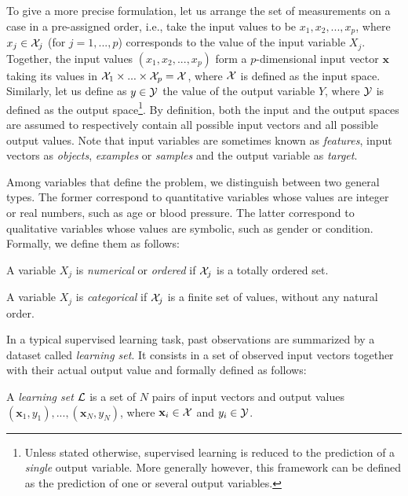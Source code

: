 To give a more precise formulation, let us arrange the set of measurements on a
case in a pre-assigned order, i.e., take the input values to be $x_1, x_2, ...,
x_p$, where $x_j \in {\cal X}_j$ (for $j = 1, ..., p$) corresponds to the value
of the input variable $X_j$. Together, the input values $(x_1, x_2, ..., x_p)$
form a $p$-dimensional input vector $\mathbf{x}$ taking its values in ${\cal
X}_1 \times ... \times {\cal X}_p = {\cal X}$, where ${\cal X}$ is defined as
the input space. Similarly, let us define as $y \in {\cal Y}$ the value of the
output variable $Y$, where ${\cal Y}$ is defined as the output
space\footnote{Unless stated otherwise, supervised learning is reduced to the
prediction of a \textit{single} output variable. More generally however, this
framework can be defined as the prediction of one or several output variables.}.
By definition, both the input and the output spaces are assumed to respectively
contain all possible input vectors and all possible output values. Note that
input variables are sometimes known as {\it features}, input vectors as {\it
objects}, {\it examples} or {\it samples} and the output variable as {\it
target}.

Among variables that define the problem, we distinguish between two general
types. The former correspond to quantitative variables whose values are integer
or real numbers, such as age or blood pressure. The latter correspond to
qualitative variables whose values are symbolic, such as gender or condition.
Formally, we define them as follows:

\begin{definition}
A variable $X_j$ is \emph{numerical} or \emph{ordered} if ${\cal X}_j$ is a
totally ordered set.
\end{definition}

\begin{definition}
A variable $X_j$ is \emph{categorical} if ${\cal X}_j$ is a finite set of values,
without any natural order.
\end{definition}

In a typical supervised learning task, past observations are summarized by a
dataset called {\it learning set}. It consists in a set of observed input
vectors together with their actual output value and formally defined as
follows:

\begin{definition}
A \emph{learning set} ${\cal L}$ is a set of $N$
pairs of input vectors and output values $(\mathbf{x}_1, y_1), ...,
(\mathbf{x}_N, y_N)$, where $\mathbf{x}_i \in {\cal X}$ and $y_i \in {\cal Y}$.
\end{definition}

